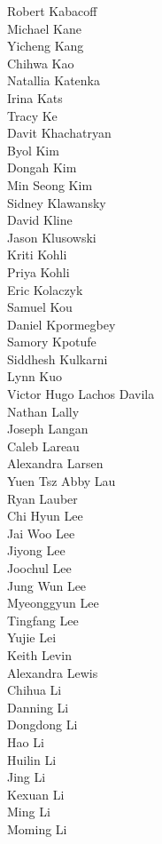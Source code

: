 Robert Kabacoff\\
Michael Kane\\
Yicheng Kang\\
Chihwa Kao\\
Natallia Katenka\\
Irina Kats\\
Tracy Ke\\
Davit Khachatryan\\
Byol Kim\\
Dongah Kim\\
Min Seong Kim\\
Sidney Klawansky\\
David Kline\\
Jason Klusowski\\
Kriti Kohli\\
Priya Kohli\\
Eric Kolaczyk\\
Samuel Kou\\
Daniel Kpormegbey\\
Samory Kpotufe\\
Siddhesh Kulkarni\\
Lynn Kuo\\
Victor Hugo Lachos Davila\\
Nathan Lally\\
Joseph Langan\\
Caleb Lareau\\
Alexandra Larsen\\
Yuen Tsz Abby Lau\\
Ryan Lauber\\
Chi Hyun Lee\\
Jai Woo Lee\\
Jiyong Lee\\
Joochul Lee\\
Jung Wun Lee\\
Myeonggyun Lee\\
Tingfang Lee\\
Yujie Lei\\
Keith Levin\\
Alexandra Lewis\\
Chihua Li\\
Danning Li\\
Dongdong Li\\
Hao Li\\
Huilin Li\\
Jing Li\\
Kexuan Li\\
Ming Li\\
Moming Li\\
